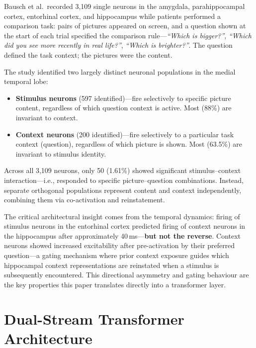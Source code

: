 \documentclass[11pt,a4paper]{article}
\theoremstyle{definition}
\begin{document}
Bausch et al.\ recorded 3,109 single neurons in the amygdala, parahippocampal cortex, entorhinal cortex, and hippocampus while patients performed a comparison task: pairs of pictures appeared on screen, and a question shown at the start of each trial specified the comparison rule---\emph{``Which is bigger?''}, \emph{``Which did you see more recently in real life?''}, \emph{``Which is brighter?''}. The question defined the task context; the pictures were the content.

The study identified two largely distinct neuronal populations in the medial temporal lobe:

\begin{itemize}
  \item \textbf{Stimulus neurons} (597 identified)---fire selectively to specific picture content, regardless of which question context is active. Most (88\%) are invariant to context.
  \item \textbf{Context neurons} (200 identified)---fire selectively to a particular task context (question), regardless of which picture is shown. Most (63.5\%) are invariant to stimulus identity.
\end{itemize}

Across all 3,109 neurons, only 50 (1.61\%) showed significant stimulus--context interaction---i.e., responded to specific picture--question combinations. Instead, separate orthogonal populations represent content and context independently, combining them via co-activation and reinstatement.

The critical architectural insight comes from the temporal dynamics: firing of stimulus neurons in the entorhinal cortex predicted firing of context neurons in the hippocampus after approximately 40\,ms---\textbf{but not the reverse}. Context neurons showed increased excitability after pre-activation by their preferred question---a gating mechanism where prior context exposure guides which hippocampal context representations are reinstated when a stimulus is subsequently encountered. This directional asymmetry and gating behaviour are the key properties this paper translates directly into a transformer layer.

\section{Dual-Stream Transformer Architecture}
\end{document}
